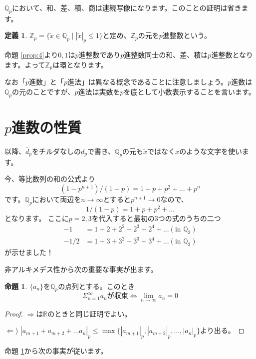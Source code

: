 \documentclass[uplatex]{jsarticle}
\newcommand{\Z}{\mathbb{Z}}
\newcommand{\Q}{\mathbb{Q}}
\newcommand{\R}{\mathbb{R}}
\theoremstyle{definition} %
\newtheorem{defi}[thm]{定義}
\newtheorem{prop}[thm]{命題}
\begin{document}
$\Q_p$において、和、差、積、商は連続写像になります。このことの証明は省きます。

\begin{oframed}\begin{defi}
$\Z_p = \{\tilde{x} \in \Q_p \mid |\tilde{x}|_p \le 1 \}$と定め、$\Z_p$の元を$p$進整数という。
\end{defi}\end{oframed}

命題 \ref{prop:4}より$0, 1$は$p$進整数であり$p$進整数同士の和、差、積は$p$進整数となります。よって$\Z_p$は環となります。

なお「$p$進数」と「$p$進法」は異なる概念であることに注意しましょう。$p$進数は$\Q_p$の元のことですが、$p$進法は実数を$p$を底として小数表示することを言います。

\section{$p$進数の性質}

以降、$\tilde{d_p}$をチルダなしの$d_p$で書き、$\Q_p$の元も$\tilde{x}$ではなく$x$のような文字を使います。

今、等比数列の和の公式より
\[(1-p^{n+1}) / (1-p) = 1 + p + p^2 + \dots + p^n\]
です。$\Q_p$において両辺を$n \to \infty$とすると$p^{n+1} \to 0$なので、
\[1 / (1-p) = 1 + p + p^2 + \dots\]
となります。
ここに$p = 2, 3$を代入すると最初の3つの式のうちの二つ
\begin{align*}
-1 &= 1 + 2 + 2^2 + 2^3 + 2^4 + \dots (\text{in } \Q_2) \\
-1/2 &= 1 + 3 + 3^2 + 3^3 + 3^4 + \dots (\text{in } \Q_3)
\end{align*}
が示せました！

非アルキメデス性から次の重要な事実が出ます。

\begin{oframed}\begin{prop}\label{prop:3}
$\{a_n\}$を$\Q_p$の点列とする。このとき
\[\Sigma_{n=1}^\infty a_n が収束 \iff \lim_{n\to\infty} a_n = 0\]
\end{prop}\end{oframed}
\begin{proof}
$\Rightarrow$は$\R$のときと同じ証明でよい。

$\Leftarrow$) $|a_{m+1} + a_{m+2} + \dots a_n|_p \leq \max\{|a_{m+1}|_p,  |a_{m+2}|_p, \dots, |a_n|_p\}$より出る。
\end{proof}

命題 \ref{prop:3}から次の事実が従います。
\end{document}
